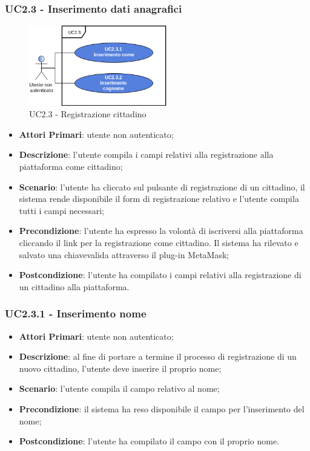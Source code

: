 \subsubsection{UC2.3 - Inserimento dati anagrafici}
\begin{figure}[h]
	\includegraphics[width=6cm]{res/images/UC2-3Registrazione-cliente.png}
	\centering
	\caption{UC2.3 - Registrazione cittadino}
\end{figure}
\begin{itemize}
	\item \textbf{Attori Primari}: utente non autenticato;
	\item \textbf{Descrizione}: l'utente compila i campi relativi alla registrazione alla piattaforma come cittadino;
	\item \textbf{Scenario}: l'utente ha cliccato sul pulsante di registrazione di un cittadino, il sistema rende disponibile il form di registrazione relativo e l'utente compila tutti i campi necessari;
	\item \textbf{Precondizione}: l'utente ha espresso la volontà di iscriversi alla piattaforma cliccando il link per la registrazione come cittadino. Il sistema ha rilevato e salvato una chiave\glosp valida attraverso il plug-in MetaMask\glo;
	\item \textbf{Postcondizione}: l'utente ha compilato i campi relativi alla registrazione di un cittadino alla piattaforma.
\end{itemize}
\subsubsection{UC2.3.1 - Inserimento nome}
\begin{itemize}
	\item \textbf{Attori Primari}: utente non autenticato;
	\item \textbf{Descrizione}: al fine di portare a termine il processo di registrazione di un nuovo cittadino, l'utente deve inserire il proprio nome;
	\item \textbf{Scenario}: l'utente compila il campo relativo al nome;
	\item \textbf{Precondizione}: il sistema ha reso disponibile il campo per l'inserimento del nome;
	\item \textbf{Postcondizione}: l'utente ha compilato il campo con il proprio nome.
\end{itemize}
